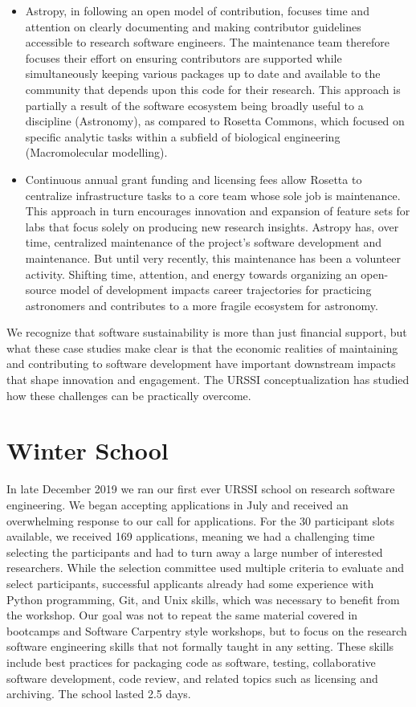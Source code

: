 \documentclass[
]{book}
\begin{document}
\begin{itemize}
\item
  Astropy, in following an open model of contribution, focuses time and
  attention on clearly documenting and making contributor guidelines
  accessible to research software engineers. The maintenance team
  therefore focuses their effort on ensuring contributors are supported
  while simultaneously keeping various packages up to date and available
  to the community that depends upon this code for their research. This approach is
  partially a result of the software ecosystem being broadly useful to a
  discipline (Astronomy), as compared to Rosetta Commons, which focused on
  specific analytic tasks within a subfield of biological engineering
  (Macromolecular modelling).
\item
  Continuous annual grant funding and licensing fees allow Rosetta to
  centralize infrastructure tasks to a core team whose sole job is
  maintenance. This approach in turn encourages innovation and expansion of feature
  sets for labs that focus solely on producing new research insights.
  Astropy has, over time, centralized maintenance of the project's software
  development and maintenance. But until very recently, this maintenance has been a
  volunteer activity. Shifting time, attention, and energy towards organizing
  an open-source model of development impacts career trajectories for
  practicing astronomers and contributes to a more fragile ecosystem for astronomy.
\end{itemize}

We recognize that software sustainability is more than just financial support,
but what these case studies make clear is that the economic realities of
maintaining and contributing to software development have important downstream
impacts that shape innovation and engagement. The URSSI conceptualization
has studied how these challenges can be practically overcome.

\hypertarget{winter-school}{%
\section{Winter School}\label{winter-school}}

In late December 2019 we ran our
first ever URSSI school on research software engineering. We began accepting
applications in July and received an overwhelming response to our call for
applications. For the 30 participant slots available, we received 169
applications, meaning we had a challenging time selecting the participants
and had to turn away a large number of interested researchers. While the
selection committee used multiple criteria to evaluate and select participants,
successful applicants already had some experience with Python programming, Git,
and Unix skills, which was necessary to benefit from the workshop. Our goal
was not to repeat the same material covered in bootcamps and Software Carpentry
style workshops, but to focus on the research software engineering skills that
not formally taught in any setting. These skills include best practices
for packaging code as software, testing, collaborative software development,
code review, and related topics such as licensing and archiving. The school
lasted 2.5 days.
\end{document}
